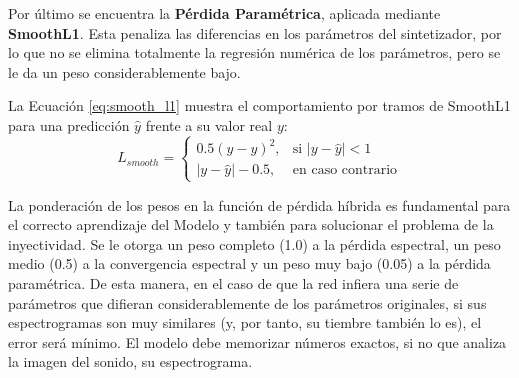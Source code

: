 Por último se encuentra la \textbf{Pérdida Paramétrica}, aplicada mediante \textbf{SmoothL1}. Esta penaliza las diferencias en los parámetros
del sintetizador, por lo que no se elimina totalmente la regresión numérica de los parámetros, pero se le da un peso
considerablemente bajo. 

La Ecuación \ref{eq:smooth_l1} muestra el comportamiento por tramos de SmoothL1 para una predicción $\hat{y}$ frente a su valor real $y$:
\begin{equation}
L_{smooth} = 
\begin{cases} 
0.5 (y - \hat{y})^2, & \text{si } |y - \hat{y}| < 1 \\ 
|y - \hat{y}| - 0.5, & \text{en caso contrario} 
\end{cases}
\label{eq:smooth_l1}
\end{equation}

La ponderación de los pesos en la función de pérdida híbrida es fundamental para el correcto aprendizaje del Modelo
y también para solucionar el problema de la inyectividad. Se le otorga un peso completo (1.0) a la pérdida espectral,
un peso medio (0.5) a la convergencia espectral y un peso muy bajo (0.05) a la pérdida paramétrica. De esta manera, en 
el caso de que la red infiera una serie de parámetros que difieran considerablemente de los parámetros originales, si sus 
espectrogramas son muy similares (y, por tanto, su tiembre también lo es), el error será mínimo. El modelo debe memorizar números
exactos, si no que analiza la imagen del sonido, su espectrograma.
